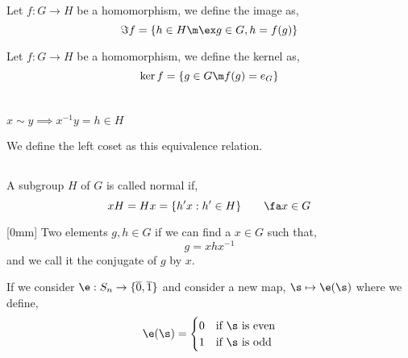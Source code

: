 \documentclass{article}
\begin{document}
\begin{ndefi}[Image]
  Let $f : G \to H$ be a homomorphism, we define the image as,
  $$ \Im f = \{ h \in H \m \ex g \in G, h = f(g)\} $$
\end{ndefi}

\begin{ndefi}[Kernel]
  Let $f : G \to H$ be a homomorphism, we define the kernel as,
  $$ \ker f = \{ g \in G \m f(g) = e_G \} $$
\end{ndefi}

\section[Cosets and Normal Subgroups]{}

\begin{ndefi}[Relation]
  $x \sim y \implies x^{-1}y = h\in H$
\end{ndefi}

\begin{ndefi}
  We define the left coset as this equivalence relation.
\end{ndefi}

\subsection[Normal Subgroups]{}

\begin{ndefi}
  A subgroup $H$ of $G$ is called normal if,
  $$ xH = Hx = \{h'x : h' \in H\} \qquad \fa x \in G $$
\end{ndefi}

\begin{ndefi}[Conjugate][0mm]
  Two elements $g,h \in G$ if we can find a $x \in G$ such that,
  $$ g = x h x^{-1} $$
  and we call it the conjugate of $g$ by $x$.
\end{ndefi}

\begin{ndefi}[Signature]
  If we consider $\e : S_n \to \{\overline{0}, \overline{1}\}$ and consider a new map, $\s \mapsto \e(\s)$ where we define,
  $$ \e(\s) = \begin{cases}
    0 & \text{if $\s$ is even}\\
    1 & \text{if $\s$ is odd}
  \end{cases} $$
\end{ndefi}
\end{document}
